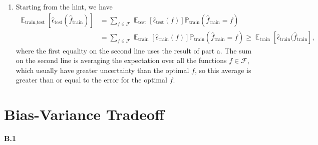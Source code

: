 \documentclass{article}
\DeclareMathOperator{\E}{\mathbb{E}}
\begin{document}
\begin{enumerate}
        \item
        Starting from the hint, we have
        \begin{align*}
                \E_\text{train,test}[\hat{\epsilon}_\text{test}(\hat{f}_\text{train})]
                &= \sum_{f \in \mathcal{F}} \E_\text{test}[\hat{\epsilon}_\text{test}(f)] \mathbb{P}_\text{train}(\hat{f}_\text{train} = f) \\
                &= \sum_{f \in \mathcal{F}} \E_\text{train}[\hat{\epsilon}_\text{train}(f)] \mathbb{P}_\text{train}(\hat{f}_\text{train} = f)
                \geq \E_\text{train}[\hat{\epsilon}_\text{train}(\hat{f}_\text{train}],
        \end{align*}
        where the first equality on the second line uses the result of part a.
        The sum on the second line is averaging the expectation over all the functions $f \in \mathcal{F}$, which usually have greater uncertainty than the optimal $f$, so this average is greater than or equal to the error for the optimal $f$.
\end{enumerate}

\newpage

\section*{Bias-Variance Tradeoff}

\textbf{B.1}
\end{document}
